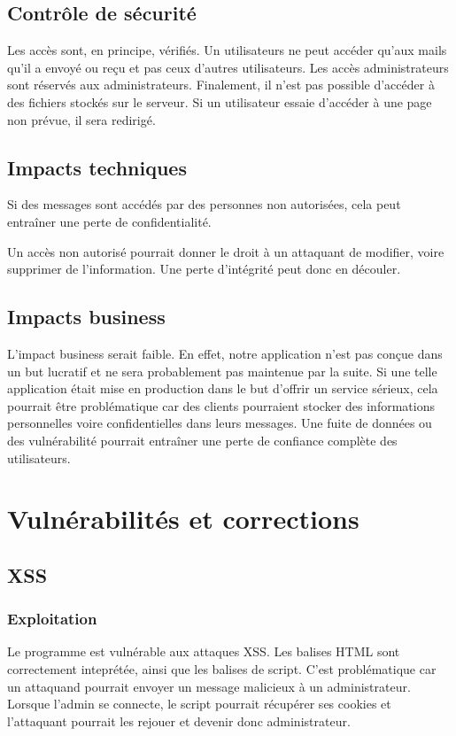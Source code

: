 \documentclass[12pt]{article}
\begin{document}
\subsection{Contrôle de sécurité}
Les accès sont, en principe, vérifiés. Un utilisateurs ne peut accéder qu'aux mails qu'il a envoyé ou reçu et pas ceux d'autres utilisateurs. Les accès administrateurs sont réservés aux administrateurs. Finalement, il n'est pas possible d'accéder à des fichiers stockés sur le serveur. Si un utilisateur essaie d'accéder à une page non prévue, il sera redirigé.

\subsection{Impacts techniques}
Si des messages sont accédés par des personnes non autorisées, cela peut entraîner une perte de confidentialité.

Un accès non autorisé pourrait donner le droit à un attaquant de modifier, voire supprimer de l'information. Une perte d'intégrité peut donc en découler.

\subsection{Impacts business}
L'impact business serait faible. En effet, notre application n'est pas conçue dans un but lucratif et ne sera probablement pas maintenue par la suite. Si une telle application était mise en production dans le but d'offrir un service sérieux, cela pourrait être problématique car des clients pourraient stocker des informations personnelles voire confidentielles  dans leurs messages. Une fuite de données ou des vulnérabilité pourrait entraîner une perte de confiance complète des utilisateurs.

\section{Vulnérabilités et corrections}
\subsection{XSS}
\subsubsection{Exploitation}
Le programme est vulnérable aux attaques XSS. Les balises HTML sont correctement inteprétée, ainsi que les balises de script. C'est problématique car un attaquand pourrait envoyer un message malicieux à un administrateur. Lorsque l'admin se connecte, le script pourrait récupérer ses cookies et l'attaquant pourrait les rejouer et devenir donc administrateur.
\end{document}
